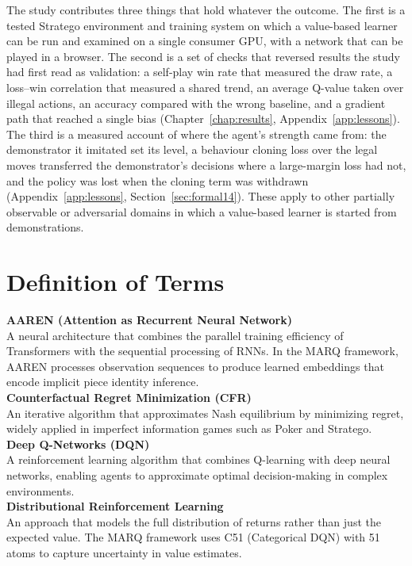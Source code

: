 The study contributes three things that hold whatever the outcome. The first is a tested Stratego environment and training system on which a value-based learner can be run and examined on a single consumer GPU, with a network that can be played in a browser. The second is a set of checks that reversed results the study had first read as validation: a self-play win rate that measured the draw rate, a loss--win correlation that measured a shared trend, an average Q-value taken over illegal actions, an accuracy compared with the wrong baseline, and a gradient path that reached a single bias (Chapter~\ref{chap:results}, Appendix~\ref{app:lessons}). The third is a measured account of where the agent's strength came from: the demonstrator it imitated set its level, a behaviour cloning loss over the legal moves transferred the demonstrator's decisions where a large-margin loss had not, and the policy was lost when the cloning term was withdrawn (Appendix~\ref{app:lessons}, Section~\ref{sec:formal14}). These apply to other partially observable or adversarial domains in which a value-based learner is started from demonstrations.

\section{Definition of Terms}

\noindent\textbf{AAREN (Attention as Recurrent Neural Network)} \\
A neural architecture that combines the parallel training efficiency of Transformers with the sequential processing of RNNs. In the MARQ framework, AAREN processes observation sequences to produce learned embeddings that encode implicit piece identity inference. \\[6pt]

\noindent\textbf{Counterfactual Regret Minimization (CFR)} \\
An iterative algorithm that approximates Nash equilibrium by minimizing regret, widely applied in imperfect information games such as Poker and Stratego. \\[6pt]

\noindent\textbf{Deep Q-Networks (DQN)} \\
A reinforcement learning algorithm that combines Q-learning with deep neural networks, enabling agents to approximate optimal decision-making in complex environments. \\[6pt]

\noindent\textbf{Distributional Reinforcement Learning} \\
An approach that models the full distribution of returns rather than just the expected value. The MARQ framework uses C51 (Categorical DQN) with 51 atoms to capture uncertainty in value estimates. \\[6pt]

